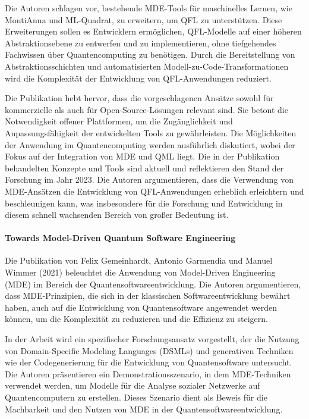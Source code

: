 Die Autoren schlagen vor, bestehende MDE-Tools für maschinelles Lernen, wie MontiAnna und ML-Quadrat, zu erweitern, um QFL 
zu unterstützen. Diese Erweiterungen sollen es Entwicklern ermöglichen, QFL-Modelle auf einer höheren 
Abstraktionsebene zu entwerfen und zu implementieren, ohne tiefgehendes Fachwissen über Quantencomputing zu benötigen. 
Durch die Bereitstellung von Abstraktionsschichten und automatisierten Modell-zu-Code-Transformationen wird die Komplexität 
der Entwicklung von QFL-Anwendungen reduziert.

Die Publikation hebt hervor, dass die vorgeschlagenen Ansätze sowohl für kommerzielle als auch für 
Open-Source-Lösungen relevant sind. Sie betont die Notwendigkeit offener Plattformen, um die Zugänglichkeit und 
Anpassungsfähigkeit der entwickelten Tools zu gewährleisten. Die Möglichkeiten der Anwendung im Quantencomputing werden 
ausführlich diskutiert, wobei der Fokus auf der Integration von MDE und QML liegt. Die in der Publikation 
behandelten Konzepte und Tools sind aktuell und reflektieren den Stand der Forschung im Jahr 2023. 
Die Autoren argumentieren, dass die Verwendung von MDE-Ansätzen die Entwicklung von QFL-Anwendungen 
erheblich erleichtern und beschleunigen kann, was insbesondere für die Forschung und 
Entwicklung in diesem schnell wachsenden Bereich von großer Bedeutung ist.

\paragraph{Towards Model-Driven Quantum Software Engineering}

Die Publikation von Felix Gemeinhardt, Antonio Garmendia und Manuel Wimmer (2021) \cite{gemeinhardt2021towards} beleuchtet die Anwendung von 
Model-Driven Engineering (MDE) im Bereich der Quantensoftwareentwicklung. Die Autoren argumentieren, dass MDE-Prinzipien, 
die sich in der klassischen Softwareentwicklung bewährt haben, auch auf die Entwicklung von Quantensoftware angewendet 
werden können, um die Komplexität zu reduzieren und die Effizienz zu steigern.

In der Arbeit wird ein spezifischer Forschungsansatz vorgestellt, der die Nutzung von Domain-Specific Modeling Languages (DSMLs) und 
generativen Techniken wie der Codegenerierung für die Entwicklung von Quantensoftware untersucht. Die Autoren 
präsentieren ein Demonstrationsszenario, in dem MDE-Techniken verwendet werden, um Modelle für die Analyse 
sozialer Netzwerke auf Quantencomputern zu erstellen. Dieses Szenario dient als Beweis für die Machbarkeit 
und den Nutzen von MDE in der Quantensoftwareentwicklung.

